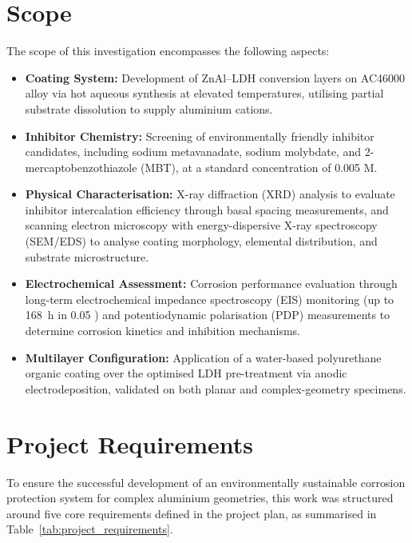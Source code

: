 \documentclass[11pt,twoside,a4paper,final]{report}
\begin{document}
\section{Scope}
The scope of this investigation encompasses the following aspects:
\begin{itemize}
    \item \textbf{Coating System:} Development of ZnAl--LDH conversion layers on AC46000 alloy via hot aqueous synthesis at elevated temperatures, utilising partial substrate dissolution to supply aluminium cations.
    
    \item \textbf{Inhibitor Chemistry:} Screening of environmentally friendly inhibitor candidates, including sodium metavanadate, sodium molybdate, and 2-mercaptobenzothiazole (MBT), at a standard concentration of 0.005 M.
    
    \item \textbf{Physical Characterisation:} X-ray diffraction (XRD) analysis to evaluate inhibitor intercalation efficiency through basal spacing measurements, and scanning electron microscopy with energy-dispersive X-ray spectroscopy (SEM/EDS) to analyse coating morphology, elemental distribution, and substrate microstructure.
    
    \item \textbf{Electrochemical Assessment:} Corrosion performance evaluation through long-term electrochemical impedance spectroscopy (EIS) monitoring (up to \qty{168}{\hour} in \qty{0.05}{\molar} ) and potentiodynamic polarisation (PDP) measurements to determine corrosion kinetics and inhibition mechanisms.
    
    \item \textbf{Multilayer Configuration:} Application of a water-based polyurethane organic coating over the optimised LDH pre-treatment via anodic electrodeposition, validated on both planar and complex-geometry specimens.
\end{itemize}

\section{Project Requirements}
\label{sec:project_requirements}

To ensure the successful development of an environmentally sustainable corrosion protection system for complex aluminium geometries, this work was structured around five core requirements defined in the project plan, as summarised in Table~\ref{tab:project_requirements}.
\end{document}
